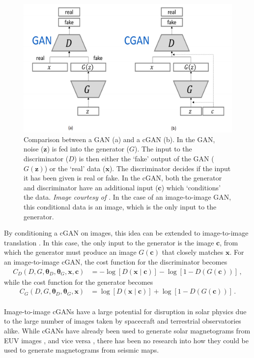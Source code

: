 \documentclass[11pt,a4paper,onecolumn]{report}
\begin{document}
\begin{figure}[t]
  \centering
  \includegraphics[width = 0.6\linewidth]{gan_cgan.png}
  \caption{Comparison between a GAN (a) and a cGAN (b). In the GAN, noise
  (\(\bm{z}\)) is fed into the generator (\(G\)). The input to the discriminator
  (\(D\)) is then either the `fake' output of the GAN (\(G(\bm{z})\)) or the
  `real' data (\(\bm{x}\)). The discriminator decides if the input it has been
  given is real or fake. In the cGAN, both the generator and discriminator have
  an additional input (\(\bm{c}\)) which `conditions' the data. \textit{Image courtesy of
  \citep{mirza_conditional_2014}}. In the case of an image-to-image GAN, this
  conditional data is an image, which is the only input to the generator. }
  \label{fig:gans}
\end{figure}


By conditioning a cGAN on images, this idea can be extended to image-to-image
translation \citep{isola2017image}. In this case, the only input to the generator
is the image \(\bm{c}\), from which the generator must produce an image
\(G(\bm{c})\) that closely matches \(\bm{x}\). For an image-to-image cGAN, the
cost function for the discriminator becomes
\begin{align}
  C_D(D, G, \bm{\theta}_D, \bm{\theta}_G, \bm{x}, \bm{c}) &=
  -\log[D(\bm{x}\mid \bm{c})] - \log[1 - D(G(\bm{c}))]\,,
\end{align}
while the cost function for the generator becomes
\begin{align}
  C_G(D, G, \bm{\theta}_D, \bm{\theta}_G, \bm{x})
  &= \log[D(\bm{x}\mid \bm{c})] + \log[1 - D(G(\bm{c}))]\,.
\end{align}\\


Image-to-image cGANs have a large potential for disruption in solar physics due
to the large number of images taken by spacecraft and terrestrial observatories
alike. While cGANs have already been used to generate solar magnetograms from EUV images
\citep{Kim2019}, and vice versa \citep{park_generation_2019}, there has been no
research into how they could be used to generate magnetograms from seismic maps.
\end{document}
